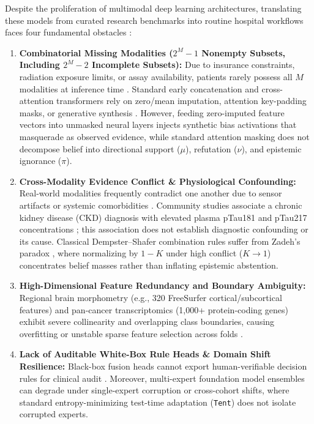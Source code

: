 \documentclass[10pt,twocolumn]{article}
\begin{document}
Despite the proliferation of multimodal deep learning architectures, translating these models
from curated research benchmarks into routine hospital workflows faces four fundamental
obstacles \cite{shaik2024survey,shao2024dual,yao2024drfuse,%
liang2021multibench}:
\begin{enumerate}[leftmargin=1.4em,itemsep=1pt,topsep=2pt]
    \item \textbf{Combinatorial Missing Modalities ($2^M-1$ Nonempty Subsets, Including $2^M-2$
    Incomplete Subsets):} Due to insurance constraints, radiation exposure limits, or assay
    availability, patients rarely possess all $M$ modalities at inference time
    \cite{wu2024muse,yao2024drfuse}. Standard early concatenation and cross-attention
    transformers \cite{vaswani2017attention,arevalo2017gated} rely on zero/mean imputation,
    attention key-padding masks, or generative synthesis \cite{ma2021smil}. However, feeding
    zero-imputed feature vectors into unmasked neural layers injects synthetic bias activations
    that masquerade as observed evidence, while standard attention masking does not decompose
    belief into directional support ($\mu$), refutation ($\nu$), and epistemic ignorance
    ($\pi$).
    \item \textbf{Cross-Modality Evidence Conflict \& Physiological Confounding:} Real-world
    modalities frequently contradict one another due to sensor artifacts or systemic
    comorbidities \cite{xu2024reliable,zhang2023provable}. Community studies associate a
    chronic
    kidney disease (CKD) diagnosis with elevated plasma pTau181 and pTau217 concentrations
    \cite{mielke2022performance}; this association does not establish diagnostic confounding
    or its cause. Classical Dempster--Shafer combination rules suffer from
    Zadeh's paradox \cite{shafer1976mathematical,zadeh1986simple,denoeux2019decision}, where
    normalizing by $1-K$ under high conflict ($K\to 1$) concentrates belief masses rather than
    inflating epistemic abstention.
    \item \textbf{High-Dimensional Feature Redundancy and Boundary Ambiguity:} Regional brain
    morphometry (e.g., 320 Free\-Surfer cortical/subcortical features) and pan-cancer
    transcriptomics (1,000+ protein-coding genes) exhibit severe collinearity and overlapping
    class boundaries, causing overfitting or unstable sparse feature selection across folds
    \cite{peng2005feature,yamada2020feature,cui2021curse}.
    \item \textbf{Lack of Auditable White-Box Rule Heads \& Domain Shift Resilience:} Black-box
    fusion heads cannot export human-\allowbreak verifiable decision rules for clinical audit
    \cite{rudin2019stop}. Moreover, multi-expert foundation model ensembles can degrade under
    single-expert corruption or cross-cohort shifts, where standard entropy-minimizing
    test-time adaptation (\texttt{Tent}) \cite{wang2021tent} does not isolate corrupted
    experts.
\end{enumerate}
\end{document}
